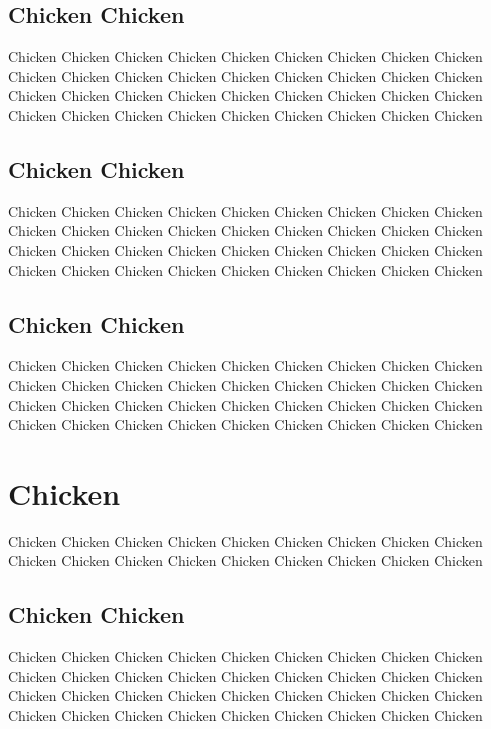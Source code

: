 \documentclass[11pt]{article} %
\begin{document}
\subsection{Chicken Chicken}

Chicken Chicken Chicken Chicken Chicken Chicken Chicken Chicken Chicken Chicken Chicken Chicken Chicken Chicken Chicken Chicken Chicken Chicken Chicken Chicken Chicken Chicken Chicken Chicken Chicken Chicken Chicken Chicken Chicken Chicken Chicken Chicken Chicken Chicken Chicken Chicken 

\subsection{Chicken Chicken}

Chicken Chicken Chicken Chicken Chicken Chicken Chicken Chicken Chicken Chicken Chicken Chicken Chicken Chicken Chicken Chicken Chicken Chicken Chicken Chicken Chicken Chicken Chicken Chicken Chicken Chicken Chicken Chicken Chicken Chicken Chicken Chicken Chicken Chicken Chicken Chicken 

\subsection{Chicken Chicken}

Chicken Chicken Chicken Chicken Chicken Chicken Chicken Chicken Chicken Chicken Chicken Chicken Chicken Chicken Chicken Chicken Chicken Chicken Chicken Chicken Chicken Chicken Chicken Chicken Chicken Chicken Chicken Chicken Chicken Chicken Chicken Chicken Chicken Chicken Chicken Chicken

\section{Chicken}

Chicken Chicken Chicken Chicken Chicken Chicken Chicken Chicken Chicken Chicken Chicken Chicken Chicken Chicken Chicken Chicken Chicken Chicken 

\subsection{Chicken Chicken}

Chicken Chicken Chicken Chicken Chicken Chicken Chicken Chicken Chicken Chicken Chicken Chicken Chicken Chicken Chicken Chicken Chicken Chicken Chicken Chicken Chicken Chicken Chicken Chicken Chicken Chicken Chicken Chicken Chicken Chicken Chicken Chicken Chicken Chicken Chicken Chicken 
\end{document}
